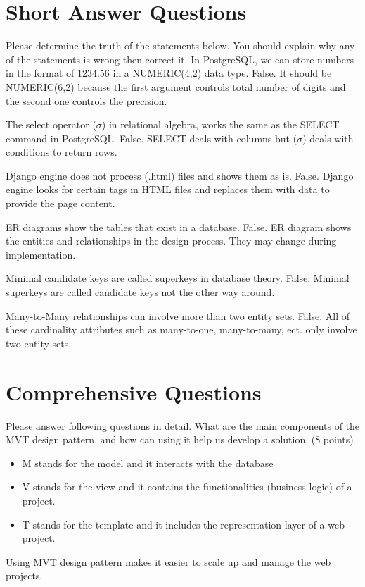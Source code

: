 \documentclass{homework}
\begin{document}
\section*{Short Answer Questions}
Please determine the truth of the statements below. You should explain why any of the statements is wrong then correct it.
\question In PostgreSQL, we can store numbers in the format of 1234.56 in a NUMERIC(4,2) data type. 
False. It should be NUMERIC(6,2) because the first argument controls total number of digits and the second one controls the precision.

\question The select operator ($\sigma$) in relational algebra, works the same as the SELECT command in PostgreSQL. 
False. SELECT deals with columns but ($\sigma$) deals with conditions to return rows.


\question Django engine does not process (.html) files and shows them as is.
False. Django engine looks for certain tags in HTML files and replaces them with data to provide the page content.

\question ER diagrams show the tables that exist in a database.
False. ER diagram shows the entities and relationships in the design process. They may change during implementation.

\question Minimal candidate keys are called superkeys in database theory.
False. Minimal superkeys are called candidate keys not the other way around.

\question Many-to-Many relationships can involve more than two entity sets.
False. All of these cardinality attributes such as many-to-one, many-to-many, ect. only involve two entity sets.

\section*{Comprehensive Questions}
Please answer following questions in detail.
\question What are the main components of the MVT design pattern, and how can using it help us develop a solution. (8 points)
\begin{itemize}
    \item M stands for the model and it interacts with the database
    \item V stands for the view and it contains the functionalities (business logic) of a project.
    \item T stands for the template and it includes the representation layer of a web project.
\end{itemize}
Using MVT design pattern makes it easier to scale up and manage the web projects.
\end{document}
